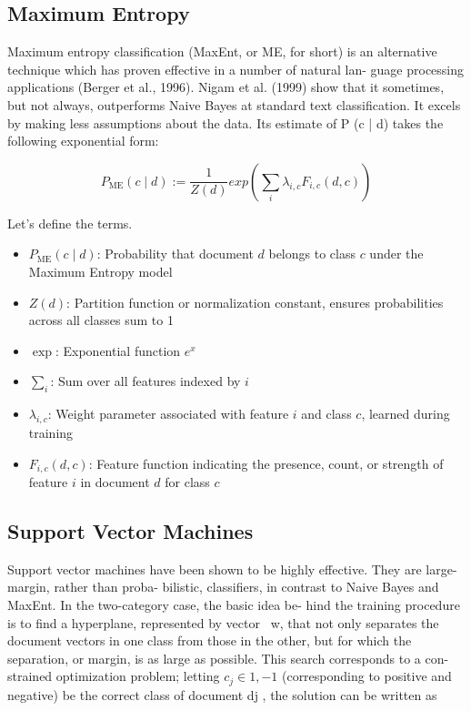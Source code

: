 \documentclass{article}
\begin{document}
\subsection{Maximum Entropy}

Maximum entropy classification (MaxEnt, or ME,
for short) is an alternative technique which has
proven effective in a number of natural lan-
guage processing applications (Berger et al., 1996).
Nigam et al. (1999) show that it sometimes, but not
always, outperforms Naive Bayes at standard text
classification. It excels by making less assumptions about the data. Its estimate of P (c | d) takes the following exponential form:

\[
    P_{\text{ME}}(c \mid d) := \frac{1}{Z(d)}exp(\sum_{i} \lambda_{i,c} F_{i,c}(d,c))
\]

Let's define the terms.

\begin{itemize}
    \item $P_{\text{ME}}(c \mid d)$: Probability that document $d$ belongs to class $c$ under the Maximum Entropy model
    \item $Z(d)$: Partition function or normalization constant, ensures probabilities across all classes sum to 1
    \item $\exp$: Exponential function $e^x$
    \item $\sum_i$: Sum over all features indexed by $i$
    \item $\lambda_{i,c}$: Weight parameter associated with feature $i$ and class $c$, learned during training
    \item $F_{i,c}(d, c)$: Feature function indicating the presence, count, or strength of feature $i$ in document $d$ for class $c$
\end{itemize}

\subsection{Support Vector Machines}

Support vector machines have been shown to be highly effective.  They are large-margin, rather than proba-
bilistic, classifiers, in contrast to Naive Bayes and
MaxEnt. In the two-category case, the basic idea be-
hind the training procedure is to find a hyperplane,
represented by vector ~w, that not only separates
the document vectors in one class from those in the
other, but for which the separation, or margin, is as
large as possible. This search corresponds to a con-
strained optimization problem; letting $c_j \in {1,-1}$
(corresponding to positive and negative) be the correct class of document dj , the solution can be written
as
\end{document}
